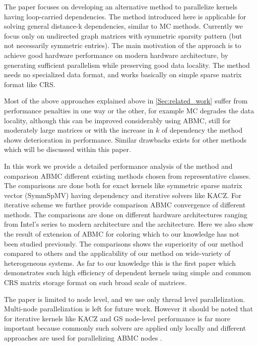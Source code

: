 The paper focuses on developing an alternative method to parallelize kernels having loop-carried dependencies. The method introduced here is applicable for solving general distance-k dependencies, similar to \acrfull{MC} methods. Currently we focus only on undirected graph \ie matrices with symmetric sparsity pattern (but not necessarily symmetric entries). The main motivation of the approach is to achieve good hardware performance on modern hardware architecture, by generating sufficient parallelism while preserving good data locality. The method needs no specialized data format, and works basically on simple sparse matrix format like \acrfull{CRS}.

Most of the above approaches explained above in \cref{Sec:related_work} suffer from performance penalties in one way or the other, for example \acrshort{MC} degrades the data locality, although this can be improved considerably using \acrfull{ABMC}, still for moderately large matrices or with the increase in $k$ of \DK dependency the method shows deterioration in performance. Similar drawbacks exists for other methods which will be discussed within this paper.

In this work we provide a detailed performance analysis of the method and comparison \acrshort{ABMC} different existing methods chosen from representative classes. The comparisons are done both for exact kernels like symmetric sparse matrix vector (\acrshort{SymmSpMV}) having \DTWO dependency and iterative solvers like \acrfull{KACZ}. For iterative scheme we further provide comparison \acrshort{ABMC} convergence of different methods. The comparisons are done on different hardware architectures ranging from Intel's \IVB series to modern \SKX architecture and the \AMD \EPY architecture. Here we also show the result of extension of \acrshort{ABMC} for \DTWO coloring which to our knowledge has not been studied previously. The comparisons shows the superiority of our method compared to others and the applicability of our method on wide-variety of heterogeneous systems. As far to our knowledge this is the first paper which demonstrates such high efficiency of \DTWO dependent kernels using simple and common \acrshort{CRS} matrix storage format on such broad scale of matrices.

The paper is limited to node level, and we use only thread level parallelization. Multi-node parallelization is left for future work. However it should be noted that for iterative kernels like \acrshort{KACZ} and \acrshort{GS} node-level performance is far more important because commonly such solvers are applied only locally and different approaches are used for parallelizing \acrshort{ABMC} nodes \cite{hpcg,CARP}.

